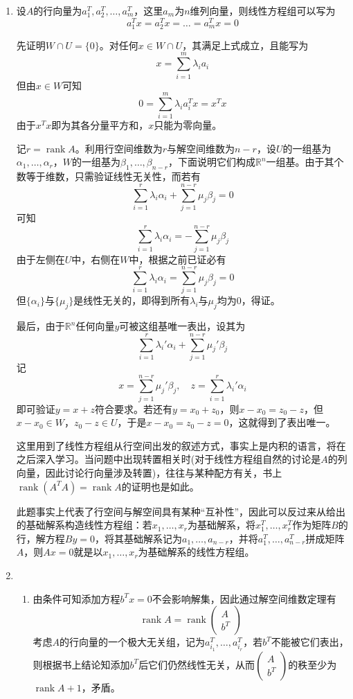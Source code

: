 \documentclass[a4paper,UTF8,fontset=windows]{ctexart}
\DeclareMathOperator{\rank}{rank}
\newcommand*{\note}{\noindent *}
\begin{document}
\begin{enumerate}
    \item

    设$A$的行向量为$a_1^T,a_2^T,\dots,a_m^T$，这里$a_m$为$n$维列向量，则线性方程组可以写为
    $$a_1^Tx=a_2^Tx=\dots=a_m^Tx=0$$

    先证明$W\cap U=\{0\}$。对任何$x\in W\cap U$，其满足上式成立，且能写为
    $$x=\sum_{i=1}^m\lambda_ia_i$$
    但由$x\in W$可知
    $$0=\sum_{i=1}^m\lambda_ia_i^Tx=x^Tx$$
    由于$x^Tx$即为其各分量平方和，$x$只能为零向量。

    记$r=\rank A$。利用行空间维数为$r$与解空间维数为$n-r$，设$U$的一组基为$\alpha_1,\dots,\alpha_r$，$W$的一组基为$\beta_1,\dots,\beta_{n-r}$，下面说明它们构成$\mathbb{R}^n$一组基。由于其个数等于维数，只需验证线性无关性，而若有
    $$\sum_{i=1}^r\lambda_i\alpha_i+\sum_{j=1}^{n-r}\mu_j\beta_j=0$$
    可知
    $$\sum_{i=1}^r\lambda_i\alpha_i=-\sum_{j=1}^{n-r}\mu_j\beta_j$$
    由于左侧在$U$中，右侧在$W$中，根据之前已证必有
    $$\sum_{i=1}^r\lambda_i\alpha_i=\sum_{j=1}^{n-r}\mu_j\beta_j=0$$
    但$\{\alpha_i\}$与$\{\mu_j\}$是线性无关的，即得到所有$\lambda_i$与$\mu_j$均为0，得证。

    最后，由于$\mathbb{R}^n$任何向量$y$可被这组基唯一表出，设其为
    $$\sum_{i=1}^r\lambda_i'\alpha_i+\sum_{j=1}^{n-r}\mu_j'\beta_j$$
    记
    $$x=\sum_{j=1}^{n-r}\mu_j'\beta_j,\quad z=\sum_{i=1}^r\lambda_i'\alpha_i$$
    即可验证$y=x+z$符合要求。若还有$y=x_0+z_0$，则$x-x_0=z_0-z$，但$x-x_0\in W$，$z_0-z\in U$，于是$x-x_0=z_0-z=0$，这就得到了表出唯一。

    \note 这里用到了线性方程组从行空间出发的叙述方式，事实上是内积的语言，将在之后深入学习。当问题中出现转置相关时(对于线性方程组自然的讨论是$A$的列向量，因此讨论行向量涉及转置)，往往与某种配方有关，书上$\rank(A^TA)=\rank A$的证明也是如此。

    \note 此题事实上代表了行空间与解空间具有某种``互补性''，因此可以反过来从给出的基础解系构造线性方程组：若$x_1,\dots,x_r$为基础解系，将$x_1^T,\dots,x_r^T$作为矩阵$B$的行，解方程$By=0$，将其基础解系记为$a_1,\dots,a_{n-r}$，并将$a_1^T,\dots,a_{n-r}^T$拼成矩阵$A$，则$Ax=0$就是以$x_1,\dots,x_r$为基础解系的线性方程组。

    \item
    \begin{enumerate}[(1)]
        \item 由条件可知添加方程$b^Tx=0$不会影响解集，因此通过解空间维数定理有
        $$\rank A=\rank\begin{pmatrix}A\\b^T\end{pmatrix}$$
        考虑$A$的行向量的一个极大无关组，记为$a_{i_1}^T,\dots,a_{i_r}^T$，若$b^T$不能被它们表出，则根据书上结论知添加$b^T$后它们仍然线性无关，从而$\begin{pmatrix}A\\b^T\end{pmatrix}$的秩至少为$\rank A+1$，矛盾。


\end{enumerate}
\end{enumerate}
\end{document}
